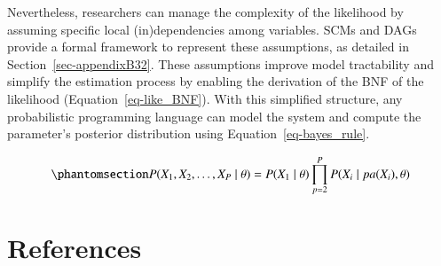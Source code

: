 \documentclass[
  authoryear,
  review,
  1p]{elsarticle}
\begin{document}
Nevertheless, researchers can manage the complexity of the likelihood by
assuming specific local (in)dependencies among variables. SCMs and DAGs
provide a formal framework to represent these assumptions, as detailed
in Section~\ref{sec-appendixB32}. These assumptions improve model
tractability and simplify the estimation process by enabling the
derivation of the BNF of the likelihood (Equation~\ref{eq-like_BNF}).
With this simplified structure, any probabilistic programming language
can model the system and compute the parameter's posterior distribution
using Equation~\ref{eq-bayes_rule}.

\begin{equation}\phantomsection\label{eq-like_BNF}{
P(X_{1}, X_{2}, \dots, X_{P} \mid \theta) = P(X_{1} \mid \theta) \prod^{P}_{p=2} P(X_{i} \mid pa(X_{i}), \theta )
}\end{equation}

\newpage{}

\section*{References}\label{references}

\renewcommand{\bibsection}{}

\end{document}
